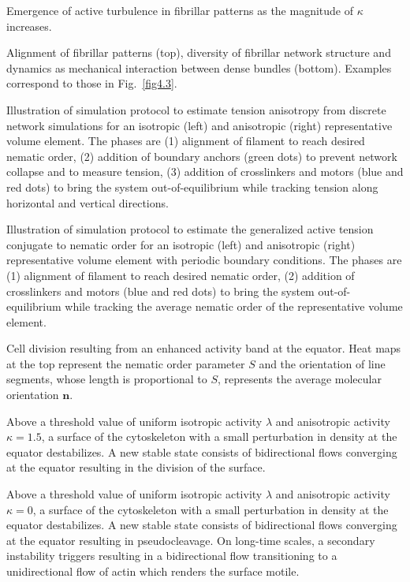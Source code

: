 \bigskip
{} Emergence of active turbulence in fibrillar patterns as the magnitude of $\kappa$ increases.

\bigskip
{} Alignment of fibrillar patterns (top), diversity of fibrillar network structure and dynamics as mechanical interaction between dense bundles (bottom). Examples correspond to those in Fig.~\ref{fig4.3}.

\bigskip
{} Illustration of simulation protocol to estimate tension anisotropy from discrete network simulations for an isotropic (left) and anisotropic (right) representative volume element. The phases are (1) alignment of filament to reach desired nematic order, (2) addition of boundary anchors (green dots) to prevent network collapse and to measure tension, (3) addition of crosslinkers and motors (blue and red dots) to bring the system out-of-equilibrium while tracking tension along horizontal and vertical directions.

\bigskip
{} Illustration of simulation protocol to estimate the generalized active tension conjugate to nematic order for an isotropic (left) and anisotropic (right) representative volume element with periodic boundary conditions. The phases are (1) alignment of filament to reach desired nematic order, (2) addition of crosslinkers and motors (blue and red dots) to bring the system out-of-equilibrium while tracking the average nematic order of the representative volume element.




\bigskip	

 \quad Cell division resulting from an enhanced activity band at the equator. Heat maps at the top represent the nematic order parameter $S$ and the orientation of line segments, whose length is proportional to $S$, represents the average molecular orientation $\bm{n}$.

\bigskip

 \quad Above a threshold value of uniform isotropic activity $\lambda$ and anisotropic activity $\kappa=1.5$, a surface of the cytoskeleton with a small perturbation in density at the equator destabilizes. A new stable state consists of bidirectional flows converging at the equator resulting in the division of the surface.

\bigskip

 \quad Above a threshold value of uniform isotropic activity $\lambda$ and anisotropic activity $\kappa=0$, a surface of the cytoskeleton with a small perturbation in density at the equator destabilizes. A new stable state consists of bidirectional flows converging at the equator resulting in pseudocleavage. On long-time scales, a secondary instability triggers resulting in a bidirectional flow transitioning to a unidirectional flow of actin which renders the surface motile.  

